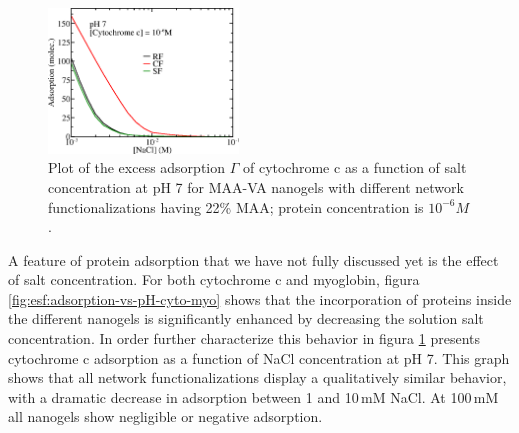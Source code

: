 
\begin{figure}
     \centering
     \includegraphics[width=0.45\textwidth]{Figures/graphs-gel2/gamma-salts-cyto.png}
     \caption{Plot of the excess adsorption $\Gamma$ of cytochrome c as a function of salt concentration at pH 7 for MAA-VA nanogels with different network functionalizations having 22\% MAA; protein concentration is $10^{-6}M$.}
     \label{fig:esf:adsorption-vs-salt-cyto}
 \end{figure}
 

A feature of protein adsorption that we have not fully discussed yet is the effect of salt concentration.
For both cytochrome c and myoglobin, figura \ref{fig:esf:adsorption-vs-pH-cyto-myo} shows that the incorporation of proteins inside the different nanogels is significantly enhanced by decreasing the solution salt concentration.
In order further characterize this behavior in  figura \ref{fig:esf:adsorption-vs-salt-cyto} presents cytochrome c adsorption as a function of NaCl concentration at pH 7. 
This graph shows that all network functionalizations display a qualitatively similar behavior, with a dramatic decrease in adsorption between 1 and 10\,mM NaCl.
At 100\,mM all nanogels show negligible or negative adsorption.

